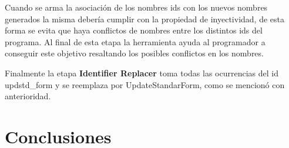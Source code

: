 \documentclass[12pt]{report}
\begin{document}
Cuando se arma la asociación de los nombres ids con los nuevos nombres generados la misma debería cumplir con la propiedad de inyectividad, de esta forma se evita que haya conflictos de nombres entre los distintos ids del programa. Al final de esta etapa la herramienta ayuda al programador a conseguir este objetivo resaltando los posibles conflictos en los nombres.

Finalmente la etapa \textbf{Identifier Replacer} toma todas las ocurrencias del id \textsf{updstd\_form} y se reemplaza por \textsf{UpdateStandarForm}, como se mencionó con anterioridad.

\section{Conclusiones}





\end{document}

